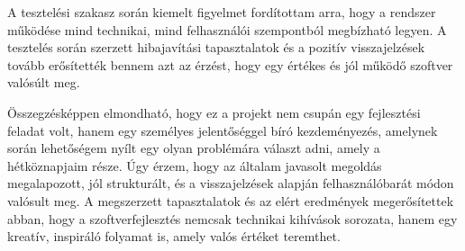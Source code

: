 A tesztelési szakasz során kiemelt figyelmet fordítottam arra, hogy a rendszer működése mind technikai, mind felhasználói szempontból megbízható legyen. A tesztelés során szerzett hibajavítási tapasztalatok és a pozitív visszajelzések tovább erősítették bennem azt az érzést, hogy egy értékes és jól működő szoftver valósúlt meg.

Összegzésképpen elmondható, hogy ez a projekt nem csupán egy fejlesztési feladat volt, hanem egy személyes jelentőséggel bíró kezdeményezés, amelynek során lehetőségem nyílt egy olyan problémára választ adni, amely a hétköznapjaim része. Úgy érzem, hogy az általam javasolt megoldás megalapozott, jól strukturált, és a visszajelzések alapján felhasználóbarát módon valósult meg. A megszerzett tapasztalatok és az elért eredmények megerősítettek abban, hogy a szoftverfejlesztés nemcsak technikai kihívások sorozata, hanem egy kreatív, inspiráló folyamat is, amely valós értéket teremthet.
